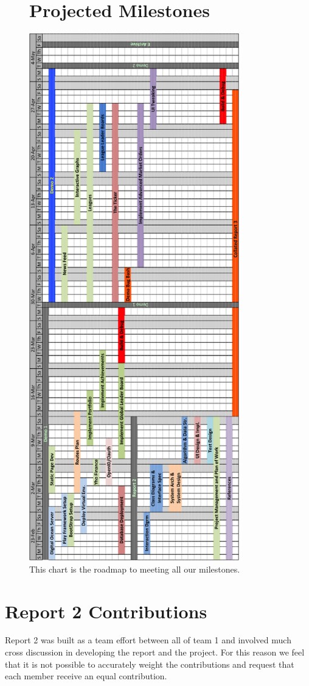\hfil\eject \pdfpagewidth=8.5in \pdfpageheight=11in
\begin{figure}
\section{Projected Milestones}
\centering
\includegraphics[height=9in]{./img/planOfWork.png}
\caption{This chart is the roadmap to meeting all our milestones.}
\end{figure}

\section{Report 2 Contributions}

Report 2 was built as a team effort between all of team 1 and involved much
cross discussion in developing the report and the project.  For this reason we
feel that it is not possible to accurately weight the contributions and request
that each member receive an equal contribution.
